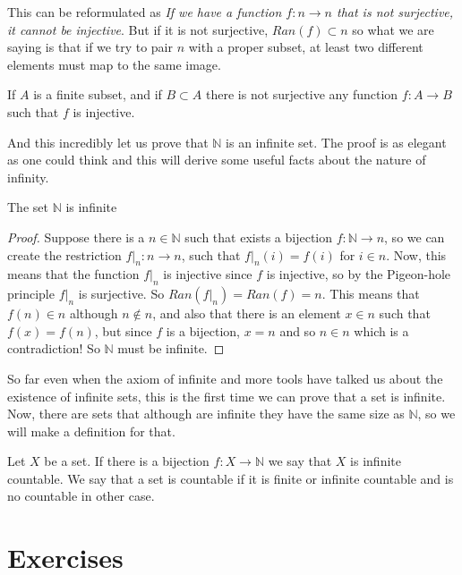 \documentclass{tufte-handout}
\begin{document}
This can be reformulated as \textit{If we have a function $f: n \to n$ that is not surjective, it cannot be injective}. But if it is not surjective, $Ran(f) \subset n$ so what we are saying is that if we try to pair $n$ with a proper subset, at least two different elements must map to the same image.

\begin{corollary}
	If $A$ is a finite subset, and if $B \subset A$ there is not surjective any function $f: A \to B$ such that $f$ is injective.
\end{corollary}

And this incredibly let us prove that $\mathbb{N}$ is an infinite set. The proof is as elegant as one could think and this will derive some useful facts about the nature of infinity.

\begin{theorem}
	The set $\mathbb{N}$ is infinite
\end{theorem}
\begin{proof}
	Suppose there is a $n \in \mathbb{N}$ such that exists a bijection $f: \mathbb{N} \to n$, so we can create the restriction $f|_n: n \to n$, such that $f|_n(i) = f(i)$ for $i \in n$. Now, this means that the function $f|_n$ is injective since $f$ is injective, so by the Pigeon-hole principle $f|_n$ is surjective. So $Ran(f|_n) = Ran(f) = n$. This means that $f(n) \in n$ although $n \not \in n$, and also that there is an element $x \in n$ such that $f(x) = f(n)$, but since $f$ is a bijection, $x = n$ and so $n \in n$ which is a contradiction! So $\mathbb{N}$ must be infinite.
\end{proof}

So far even when the axiom of infinite and more tools have talked us about the existence of infinite sets, this is the first time we can prove that a set is infinite. Now, there are sets that although are infinite they have the same size as $\mathbb{N}$, so we will make a definition for that.

\begin{definition}
	Let $X$ be a set. If there is a bijection $f: X \to \mathbb{N}$ we say that $X$ is infinite countable. We say that a set is countable if it is finite or infinite countable and is no countable in other case. 
\end{definition}

\section{Exercises}
\end{document}
